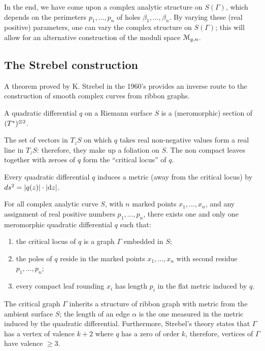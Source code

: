 In the end, we have come upon a complex analytic structure on
$S(\Gamma)$, which depends on the perimeters $p_1, \ldots, p_n$ of holes $\beta_1,
\ldots, \beta_n$. By varying these (real positive) parameters, one can vary
the complex structure on $S(\Gamma)$; this will allow for an alternative
construction of the moduli space $\mathcal{M}_{g,n}$.


\subsection{The Strebel construction}
\label{sec:strebel}
A theorem proved by K. Strebel in the 1960's provides an inverse
route to the construction of smooth complex curves from ribbon
graphs. 

\begin{definition}
  A quadratic differential $q$ on a Riemann surface $S$ is a
  (meromorphic) section of $(T^*)\sp{\otimes 2}$.
\end{definition}
The set of vectors in $T_zS$ on which $q$ takes real non-negative
values form a real line in $T_zS$: therefore, they make up a foliation
on $S$. The non compact leaves together with zeroes of $q$ form the
``critical locus'' of $q$.

Every quadratic differential $q$ induces a metric (away from the
critical locus) by $ds^2 = \lvert q(z)\rvert \cdot \lvert\mathrm{d} z\rvert$.

\begin{theorem} For all complex
  analytic curve $S$, with $n$ marked points $x_1, \ldots, x_n$, and any
  assignment of real positive numbers $p_1, \ldots, p_n$, there exists one
  and only one meromorphic quadratic differential $q$ such that:
  \begin{enumerate}
  \item the critical locus of $q$ is a graph $\Gamma$ embedded in $S$;
  \item the poles of $q$ reside in the marked points $x_1, \ldots, x_n$
    with second residue $p_1, ..., p_n$;
  \item every compact leaf rounding $x_i$ has length $p_i$ in the flat
    metric induced by $q$.
  \end{enumerate}
\end{theorem}
The critical graph $\Gamma$ inherits a structure of ribbon graph with
metric from the ambient surface $S$; the length of an edge $\alpha$ is the
one measured in the metric induced by the quadratic
differential. Furthermore, Strebel's theory states that $\Gamma$ has a
vertex of valence $k+2$ where $q$ has a zero of order $k$, therefore,
vertices of $\Gamma$ have valence $\geq3$.


